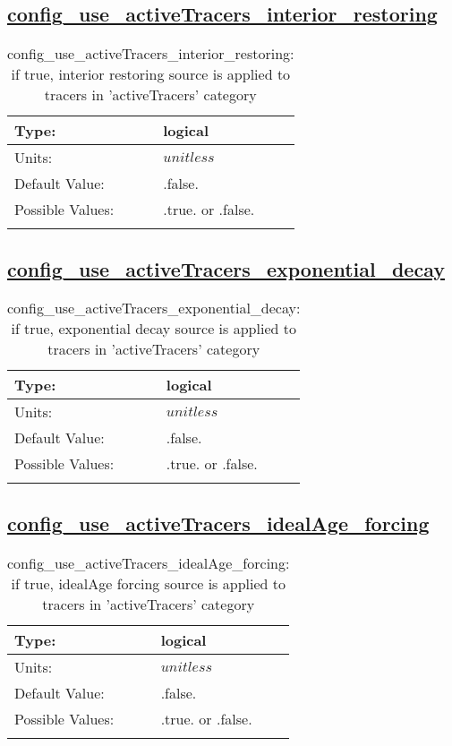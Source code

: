 \subsection[config\_use\_activeTracers\_interior\_restoring]{\hyperref[sec:nm_tab_tracer_forcing_activeTracers]{config\_use\_activeTracers\_interior\_restoring}}
\label{subsec:nm_sec_config_use_activeTracers_interior_restoring}
\begin{center}
\begin{longtable}{| p{2.0in} || p{4.0in} |}
    \hline
    Type: & logical \\
    \hline
    Units: & $unitless$ \\
    \hline
    Default Value: & .false. \\
    \hline
    Possible Values: & .true. or .false. \\
    \hline
    \caption{config\_use\_activeTracers\_interior\_restoring: if true, interior restoring source is applied to tracers in 'activeTracers' category}
\end{longtable}
\end{center}
\subsection[config\_use\_activeTracers\_exponential\_decay]{\hyperref[sec:nm_tab_tracer_forcing_activeTracers]{config\_use\_activeTracers\_exponential\_decay}}
\label{subsec:nm_sec_config_use_activeTracers_exponential_decay}
\begin{center}
\begin{longtable}{| p{2.0in} || p{4.0in} |}
    \hline
    Type: & logical \\
    \hline
    Units: & $unitless$ \\
    \hline
    Default Value: & .false. \\
    \hline
    Possible Values: & .true. or .false. \\
    \hline
    \caption{config\_use\_activeTracers\_exponential\_decay: if true, exponential decay source is applied to tracers in 'activeTracers' category}
\end{longtable}
\end{center}
\subsection[config\_use\_activeTracers\_idealAge\_forcing]{\hyperref[sec:nm_tab_tracer_forcing_activeTracers]{config\_use\_activeTracers\_idealAge\_forcing}}
\label{subsec:nm_sec_config_use_activeTracers_idealAge_forcing}
\begin{center}
\begin{longtable}{| p{2.0in} || p{4.0in} |}
    \hline
    Type: & logical \\
    \hline
    Units: & $unitless$ \\
    \hline
    Default Value: & .false. \\
    \hline
    Possible Values: & .true. or .false. \\
    \hline
    \caption{config\_use\_activeTracers\_idealAge\_forcing: if true, idealAge forcing source is applied to tracers in 'activeTracers' category}
\end{longtable}
\end{center}
